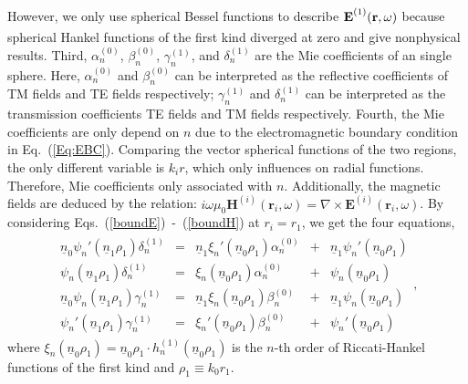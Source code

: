 \documentclass[journal=jacsat,manuscript=article,layout=traditional]{achemso}
\newcommand{\nr}{\underline{n}}
\begin{document}
However, we only use spherical Bessel functions to describe $\mathbf{E}_{\mathstrut}^{(1)}(\mathbf{r},\omega)$ because spherical Hankel functions of the first kind diverged at zero and give nonphysical results.
Third, $\alpha_n^{(0)}$, $\beta_n^{(0)}$, $\gamma_n^{(1)}$, and $\delta_n^{(1)}$ are the Mie coefficients of an single sphere.
Here, $\alpha_n^{(0)}$ and $\beta_n^{(0)}$ can be interpreted as the reflective coefficients of TM fields and TE fields respectively; $\gamma_n^{(1)}$ and $\delta_n^{(1)}$ can be interpreted as the transmission coefficients TE fields and TM fields respectively.
Fourth, the Mie coefficients are only depend on $n$ due to the electromagnetic boundary condition in Eq.~(\ref{Eq:EBC}).
Comparing the vector spherical functions of the two regions, the only different variable is $k_ir$, which only influences on radial functions.
Therefore, Mie coefficients only associated with $n$.
Additionally, the magnetic fields are deduced by the relation: $i\omega\mu_0\mathbf{H}^{(i)}(\mathbf{r}_{i},\omega) = \nabla\times\mathbf{E}^{(i)}(\mathbf{r}_{i},\omega)$.
By considering Eqs.~(\ref{boundE})~-~(\ref{boundH}) at $r_i=r_1$, we get the four equations,
\begin{align}
    \begin{array}{rlrlr}
    \nr_0\psi_n'(\nr_1\rho_1)\delta_n^{(1)} &=& 
    \nr_1\xi_n'(\nr_0\rho_1)\alpha_n^{(0)} &+& \nr_1\psi_n'(\nr_0\rho_1)\\
    \psi_n(\nr_1\rho_1)\delta_n^{(1)} &=& 
    \xi_n(\nr_0\rho_1)\alpha_n^{(0)} &+& \psi_n(\nr_0\rho_1)\\
    \nr_0\psi_n(\nr_1\rho_1)\gamma_n^{(1)} &=& 
    \nr_1\xi_n(\nr_0\rho_1)\beta_n^{(0)} &+& \nr_1\psi_n(\nr_0\rho_1)\\
    \psi_n'(\nr_1\rho_1)\gamma_n^{(1)} &=& 
    \xi_n'(\nr_0\rho_1)\beta_n^{(0)} &+& \psi_n'(\nr_0\rho_1)
    \end{array},
\end{align}
where $\xi_n(\nr_0\rho_1)=\nr_0\rho_1\cdot h_n^{(1)}(\nr_0\rho_1)$ is the $n$-th order of Riccati-Hankel functions of the first kind and $\rho_1\equiv k_0r_1$.
\end{document}
